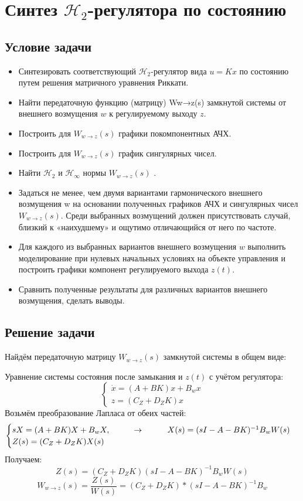 \chapter{Синтез $\mathcal{H}_2$-регулятора по состоянию}
\label{ch:chap2}
\section{Условие задачи}

\begin{itemize}
    \item Синтезировать соответствующий $\mathcal{H}_2$-регулятор вида $u = Kx$ по состоянию путем решения матричного уравнения Риккати.
    \item Найти передаточную функцию (матрицу) Ww→z(s) замкнутой системы от внешнего возмущения $w$ к регулируемому выходу $z$.
   \item Построить для $W_{w\rightarrow z}(s)$ графики покомпонентных АЧХ.
   \item Построить для $W_{w\rightarrow z}(s)$ график сингулярных чисел.
   \item Найти $\mathcal{H}_2$ и $\mathcal{H}_\infty$ нормы  $W_{w\rightarrow z}(s)$ .
   \item Задаться не менее, чем двумя вариантами гармонического внешнего возмущения
    w на основании полученных графиков АЧХ и сингулярных чисел $W_{w\rightarrow z}(s)$. 
    Среди выбранных возмущений должен присутствовать случай, близкий к «наихудшему» и ощутимо отличающийся от него по частоте.
    \item Для каждого из выбранных вариантов внешнего возмущения $w$ выполнить моделирование при нулевых начальных условиях
    на объекте управления и построить графики компонент регулируемого выхода $z(t)$.
    \item Сравнить полученные результаты для различных вариантов внешнего возмущения, сделать выводы.
\end{itemize}

\section{Решение задачи}

Найдём передаточную матрицу $W_{w\rightarrow z}(s)$ замкнутой системы в общем виде:

Уравнение системы состояния после замыкания и $z(t)$ с учётом регулятора:
$$
    \begin{cases}
        \dot{x} = (A+BK)x + B_w x \\
        z = (C_Z + D_Z K) x
    \end{cases}
$$
Возьмём преобразование Лапласа от обеих частей:
$$
    \begin{cases}
        sX = (A+BK)X + B_w X, \hspace*{1cm}\rightarrow\hspace*{1cm} X(s) = (sI - A - BK)^{-1} B_w W(s)\\
        Z(s) = (C_Z + D_Z K) X(s)
    \end{cases}
$$
Получаем:
$$
    Z(s) = (C_Z + D_Z K)(sI - A - BK)^{-1} B_w W(s)
$$
$$
    W_{w\rightarrow z}(s) = \frac{Z(s)}{W(s)} = (C_Z + D_Z K)*(sI - A - BK)^{-1} B_w
$$

